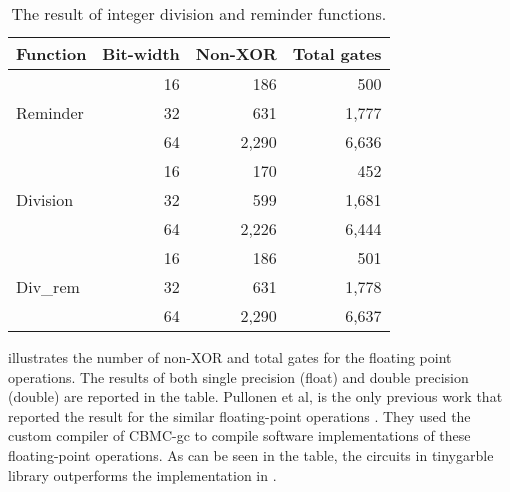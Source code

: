 \begin{table}[]
\center
\caption{The result of integer division and reminder functions.}\label{table:div}
\begin{tabular}{l||r||r|r}
	Function                  & \multicolumn{1}{c|}{Bit-width} & \multicolumn{1}{c|}{Non-XOR} & \multicolumn{1}{c}{Total gates} \\ \hline \hline
\multirow{3}{*}{Reminder} & 16        & 186     & 500         \\
                          & 32        & 631     & 1,777       \\
                          & 64        & 2,290   & 6,636       \\ \hline \hline
\multirow{3}{*}{Division} & 16        & 170     & 452         \\
                          & 32        & 599     & 1,681       \\
                          & 64        & 2,226   & 6,444       \\ \hline \hline
\multirow{3}{*}{Div\_rem} & 16        & 186     & 501         \\
                          & 32        & 631     & 1,778       \\
                          & 64        & 2,290   & 6,637
\end{tabular}
\end{table}

 illustrates the number of non-XOR and total gates for the floating point operations.
The results of both single precision (float) and double precision (double) are reported in the table.
Pullonen et al, is the only previous work that reported the result for the similar floating-point operations \cite{pullonen2015combining}.
They used the custom compiler of CBMC-\acrshort{gc} \cite{franz2014cbmc} to compile software implementations of these floating-point operations.
As can be seen in the table, the circuits in \gls{tinygarble} library outperforms the implementation in \cite{pullonen2015combining}.

